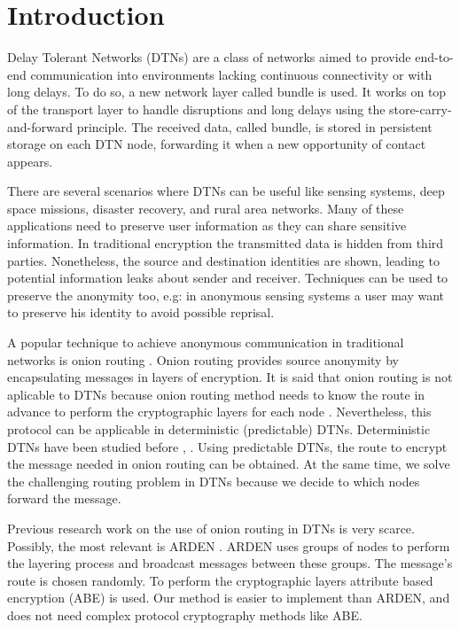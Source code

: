 \section{Introduction}\label{sec:intro}

Delay Tolerant Networks (DTNs) \cite{dtn-definition} are a class of networks aimed to provide end-to-end communication into environments lacking continuous connectivity or with long delays. To do so, a new network layer called bundle is used. It works on top of the transport layer to handle disruptions and long delays using the store-carry-and-forward principle. The received data, called bundle, is stored in persistent storage on each DTN node, forwarding it when a new opportunity of contact appears.

There are several scenarios where DTNs can be useful like sensing systems, deep space missions, disaster recovery, and rural area networks. Many of these applications need to preserve user information as they can share sensitive information. In traditional encryption the transmitted data is hidden from third parties.  Nonetheless, the source and destination identities are shown, leading to potential information leaks about sender and receiver. Techniques can be used to preserve the anonymity too, e.g: in anonymous sensing systems a user may want to preserve his identity to avoid possible reprisal.

A popular technique to achieve anonymous communication in traditional networks is onion routing \cite{onion-routing}. Onion routing provides source anonymity by encapsulating messages in layers of encryption. It is said that onion routing is not aplicable to DTNs because onion routing method needs to know the route in advance to perform the cryptographic layers for each node \cite{dtn-security-analysis}. Nevertheless, this protocol can be applicable in deterministic (predictable) DTNs. Deterministic DTNs have been studied before \cite{probabilistic-dtn}, \cite{deterministic-dtn}. Using predictable DTNs, the route to encrypt the message needed in onion routing can be obtained. At the same time, we solve the challenging routing problem in DTNs \cite{oracle-types} because we decide to which nodes forward the message.

Previous research work on the use of onion routing in DTNs is very scarce. Possibly, the most relevant is ARDEN \cite{arden}. ARDEN uses groups of nodes to perform the layering process and broadcast messages between these groups. The message's route is chosen randomly. To perform the cryptographic layers attribute based encryption (ABE) is used. Our method is easier to implement than ARDEN, and does not need complex protocol cryptography methods like ABE.


